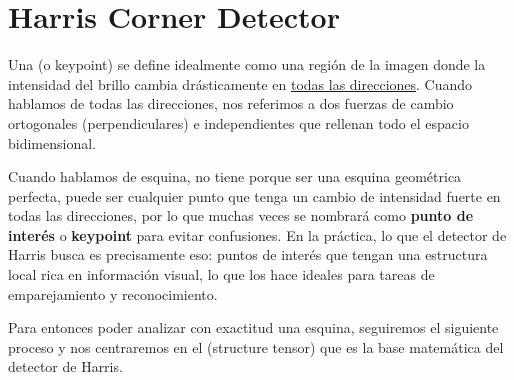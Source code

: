 \section{Harris Corner Detector}
\noindent
\begin{definicion}
    Una  (o keypoint) se define idealmente como una región de la imagen donde la intensidad del brillo cambia drásticamente en \underline{todas las direcciones}. Cuando hablamos de todas las direcciones, nos referimos a dos fuerzas de cambio ortogonales (perpendiculares) e independientes que rellenan todo el espacio bidimensional.\\ 
\end{definicion}


\begin{observacion}
    Cuando hablamos de esquina, no tiene porque ser una esquina geométrica perfecta, puede ser cualquier punto que tenga un cambio de intensidad fuerte en todas las direcciones, por lo que muchas veces se nombrará como \textbf{punto de interés} o \textbf{keypoint} para evitar confusiones. En la práctica, lo que el detector de Harris busca es precisamente eso: puntos de interés que tengan una estructura local rica en información visual, lo que los hace ideales para tareas de emparejamiento y reconocimiento.\\
\end{observacion}

\noindent
Para entonces poder analizar con exactitud una esquina, seguiremos el siguiente proceso y nos centraremos en el  (structure tensor) que es la base matemática del detector de Harris. \\

